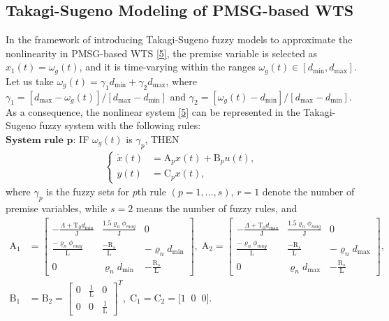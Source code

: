 \documentclass[preprint,11pt]{elsarticle}
\begin{document}
\subsection{{Takagi-Sugeno Modeling of PMSG-based WTS}}
In the framework of introducing {Takagi-Sugeno} fuzzy models to approximate the nonlinearity in PMSG-based WTS \eqref{5}, the premise variable is selected as $x_1(t)=\omega_g(t)$, and it is time-varying within the ranges
$\omega_g(t)\in[ d_{\min},d_{\max} ]$. Let us take $\omega_g(t)=\gamma_1d_{\min}+\gamma_2d_{\max}$, where $\gamma_1=[d_{\max}-\omega_g(t)]/[d_{\max}-d_{\min}]$ and $\gamma_2=[\omega_g(t)-d_{\min}]/[d_{\max}-d_{\min}]$.
 As a consequence, the nonlinear system \eqref{5} can be represented in the {Takagi-Sugeno} fuzzy system with the following rules:\\
$\textbf{System rule p:}$ {IF} $\omega_g(t)$ is $\gamma_{p}$, {THEN}
\begin{align}\label{6}
\begin{cases}
\dot{x}(t)&=\mathrm{A}_{p}x(t)+\mathrm{B}_{p}u(t),\\
y(t)&=\mathrm{C}_{p}x(t),\;
\end{cases}
\end{align}
where $\gamma_{p}$ is the fuzzy sets for $p$th rule $(p=1,...,s)$, $r=1$ denote the number of premise
variables, while $s=2$ means the number of fuzzy rules, and
\begin{align*}
\mathrm{A}_1&=
\begin{bmatrix}
-\frac{\Lambda+\mathrm{T}_0 d_{\min} }{\mathrm{J}}  &  \frac{1.5\varrho_n \phi_{mag}}{\mathrm{J}}& 0\\
\frac{-\varrho_n \phi_{mag} }{\mathrm{L}}&  \frac{-\mathrm{R}_s}{\mathrm{L}}& -\varrho_n  d_{\min}\\
0 & \varrho_n  d_{\min}& -\frac{\mathrm{R}_s}{\mathrm{L}}
\end{bmatrix},\;
\mathrm{A}_2=
\begin{bmatrix}
-\frac{\Lambda+\mathrm{T}_0 d_{\max} }{\mathrm{J}}  &  \frac{1.5\varrho_n \phi_{mag}}{\mathrm{J}}& 0\\
\frac{-\varrho_n \phi_{mag} }{\mathrm{L}}&  \frac{-\mathrm{R}_s}{\mathrm{L}}& -\varrho_n  d_{\max}\\
0 & \varrho_n  d_{\max}& -\frac{\mathrm{R}_s}{\mathrm{L}}
\end{bmatrix},\\
\mathrm{B}_1&=\mathrm{B}_2=
\begin{bmatrix}
0&\frac{1}{\mathrm{L}}&0\\
0&0&\frac{1}{\mathrm{L}}
\end{bmatrix}^T,\;
\mathrm{C}_1=\mathrm{C}_2=\big[1\;\;0\;\;0  \big].
\end{align*}
\end{document}
